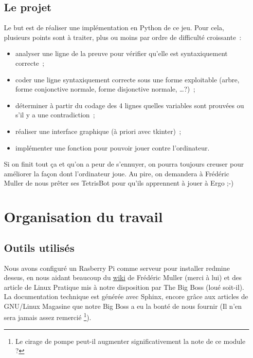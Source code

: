\documentclass[12pt, algo]{cours}
\begin{document}
\subsection{Le projet}

Le but est de réaliser une implémentation en Python de ce jeu. Pour cela, plusieurs points sont à traiter, plus ou moins par ordre de difficulté croissante~:
\nopagebreak
\begin{itemize}
\item analyser une ligne de la preuve pour vérifier qu'elle est syntaxiquement correcte~;
\item coder une ligne syntaxiquement correcte sous une forme exploitable (arbre, forme conjonctive normale, forme disjonctive normale, \dots ?)~;
\item déterminer à partir du codage des 4 lignes quelles variables sont prouvées ou s'il y a une contradiction~;
\item réaliser une interface graphique (à priori avec tkinter)~;
\item implémenter une fonction pour pouvoir jouer contre l'ordinateur.
\end{itemize}

Si on finit tout ça et qu'on a peur de s'ennuyer, on pourra toujours creuser pour améliorer la façon dont l'ordinateur joue. Au pire, on demandera à Frédéric Muller de nous prêter ses TetrisBot pour qu'ils apprennent à jouer à Ergo ;-)


\section{Organisation du travail}

\subsection{Outils utilisés}

Nous avons configuré un Rasberry Pi comme serveur pour installer redmine dessus, en nous aidant beaucoup du \href{http://juramaths.fr/redmine/projects/serveur-web-sur-un-raspberry-pi/wiki}{wiki} de Frédéric Muller (merci à lui) et des article de Linux Pratique mis à notre disposition par The Big Boss (loué soit-il). La documentation technique est générée avec Sphinx, encore grâce aux articles de GNU/Linux Magasine que notre Big Boss a eu la bonté de nous fournir (Il n'en sera jamais assez remercié \footnote{Le cirage de pompe peut-il augmenter significativement la note de ce module ?}).
\end{document}
